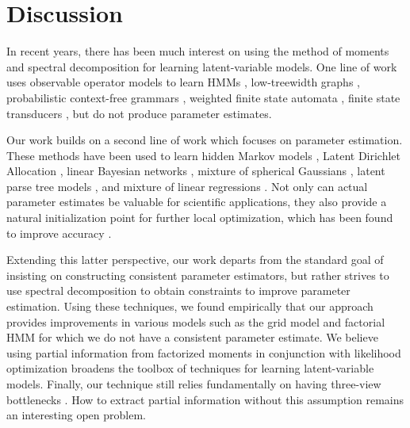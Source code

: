 \section{Discussion}

In recent years, there has been much interest
on using the method of moments and spectral decomposition
for learning latent-variable models.
One line of work uses observable operator models to learn
HMMs \cite{hsu09spectral},
low-treewidth graphs \cite{parikh12spectral},
probabilistic context-free grammars \cite{cohen12pcfg},
weighted finite state automata \cite{balle12automata},
finite state transducers \cite{balle11transducer},
but do not produce parameter estimates.

Our work builds on a second line of work which focuses
on parameter estimation.  These methods have been used to learn
hidden Markov models \cite{anandkumar12moments},
Latent Dirichlet Allocation \cite{anandkumar12lda},
linear Bayesian networks \cite{anandkumar12linear},
mixture of spherical Gaussians \cite{hsu13spherical},
latent parse tree models \cite{hsu12identifiability}, and
mixture of linear regressions \cite{chaganty13regression}.
Not only can actual parameter estimates be valuable for scientific
applications, they also provide a natural initialization point
for further local optimization, which has been found to improve accuracy
\cite{chaganty13regression}.

Extending this latter perspective,
our work departs from the standard goal of
insisting on constructing consistent parameter estimators, but rather strives
to use spectral decomposition to obtain constraints to improve
parameter estimation.  Using these techniques,
we found empirically that our approach provides
improvements in various models such as the grid model and factorial HMM
for which we do not have a consistent parameter estimate.
We believe using partial information from factorized moments
in conjunction with likelihood optimization
broadens the toolbox of techniques for learning
latent-variable models.
Finally, our technique still relies fundamentally on
having three-view bottlenecks \cite{anandkumar12moments}.
How to extract partial information without this assumption
remains an interesting open problem.


